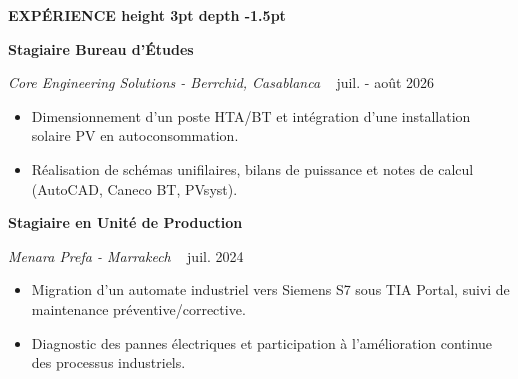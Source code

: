\documentclass[10pt,a4paper]{altacv}
\renewcommand{\cvsection}[2][]{%
  \vspace{4pt}%
  {\color{heading}\Large\bfseries #2 \hspace{0.2em}\leaders\vrule height 3pt depth -1.5pt\hfill\mbox{}}\par\vspace{3pt}
}
\renewcommand{\cvevent}[4]{%
  {\normalsize\bfseries\color{accent}#1\par}\vspace{1pt}
  \ifstrequal{#2}{}{}{%
    {\small\itshape\color{emphasis}#2\ifstrequal{#4}{}{}{ - #4}}%
  }%
  ~\hfill
  \ifstrequal{#3}{}{}{{\small\color{emphasis}#3}}%
  \par\vspace{2pt}
}
\begin{document}
\cvsection{EXPÉRIENCE}
\cvevent{Stagiaire Bureau d’Études}{Core Engineering Solutions}{juil. - août 2026}{Berrchid, Casablanca}
\begin{itemize}[leftmargin=*, label=\textbullet, nosep, itemsep=1.5pt]
  \item Dimensionnement d’un poste HTA/BT et intégration d’une installation solaire PV en autoconsommation.
  \item Réalisation de schémas unifilaires, bilans de puissance et notes de calcul (AutoCAD, Caneco BT, PVsyst).
\end{itemize}
\vspace{2pt}
\cvevent{Stagiaire en Unité de Production}{Menara Prefa}{juil. 2024}{Marrakech}
\begin{itemize}[leftmargin=*, label=\textbullet, nosep, itemsep=1.5pt]
  \item Migration d’un automate industriel vers Siemens S7 sous TIA Portal, suivi de maintenance préventive/corrective.
  \item Diagnostic des pannes électriques et participation à l’amélioration continue des processus industriels.
\end{itemize}
\end{document}
